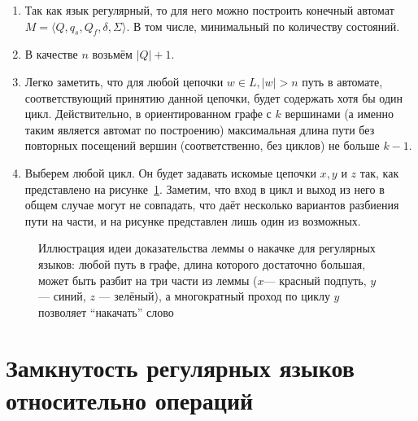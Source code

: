 \begin{enumerate}
    \item Так как язык регулярный, то для него можно построить конечный автомат $M = \langle Q, q_s,Q_f, \delta, \Sigma \rangle$. В том числе, минимальный по количеству состояний.
    \item В качестве $n$ возьмём $|Q| + 1$.
    \item Легко заметить, что для любой цепочки $w \in L, |w| > n$ путь в автомате, соответствующий принятию данной цепочки, будет содержать хотя бы один цикл.
          Действительно, в ориентированном графе с $k$ вершинами (а именно таким является автомат по построению) максимальная длина пути без повторных посещений вершин (соответственно, без циклов) не больше $k - 1$.
    \item Выберем любой цикл. Он будет задавать искомые цепочки $x, y$ и $z$ так, как представлено на рисунке~\ref{fig:reg_lang_pumping_lemma}.
    Заметим, что вход в цикл и выход из него в общем случае могут не совпадать, что даёт несколько вариантов разбиения пути на части, и на рисунке представлен лишь один из возможных.
\end{enumerate}

\begin{figure}
    \begin{center}
    \end{center}
    \caption{Иллюстрация идеи доказательства леммы о накачке для регулярных языков: любой путь в графе, длина которого достаточно большая, может быть разбит на три части из леммы ($x$--- красный подпуть, $y$ --- синий, $z$ --- зелёный), а многократный проход по циклу $y$ позволяет ``накачать'' слово}
    \label{fig:reg_lang_pumping_lemma}
\end{figure}


\section{Замкнутость регулярных языков относительно операций}

